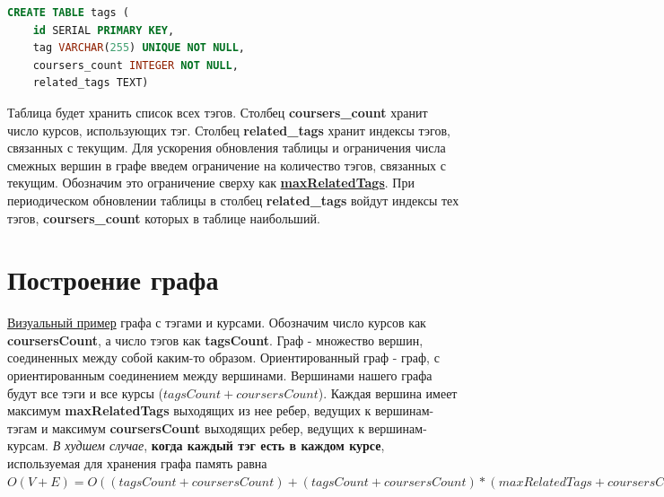 \documentclass[12pt]{article}
\begin{document}
\begin{lstlisting}[language=sql]
CREATE TABLE tags (
	id SERIAL PRIMARY KEY,
	tag VARCHAR(255) UNIQUE NOT NULL,
	coursers_count INTEGER NOT NULL,
	related_tags TEXT)
\end{lstlisting}

\noindent Таблица будет хранить список всех тэгов. \newline
Столбец \textbf{coursers\_count} хранит число курсов, использующих тэг. \newline
Столбец \textbf{related\_tags} хранит индексы тэгов, связанных с текущим. \newline
Для ускорения обновления таблицы и ограничения числа смежных вершин в графе введем ограничение на количество тэгов, связанных с текущим. Обозначим это ограничение сверху как \underline{\textbf{maxRelatedTags}}. При периодическом обновлении таблицы в столбец \textbf{related\_tags} войдут индексы тех тэгов, \textbf{coursers\_count} которых в таблице наибольший. \newline

\section*{Построение графа}
\href{https://getfile.dokpub.com/yandex/get/https://disk.yandex.ru/d/yRuwHZWdXBIIaA}{\color{blue}Визуальный пример} графа с тэгами и курсами. \newline
Обозначим число курсов как \textbf{coursersCount}, а число тэгов как \textbf{tagsCount}. \newline
Граф - множество вершин, соединенных между собой каким-то образом. Ориентированный граф - граф, с ориентированным соединением между вершинами. \newline \newline
Вершинами нашего графа будут все тэги и все курсы ($tagsCount + coursersCount$). Каждая вершина имеет максимум \textbf{maxRelatedTags} выходящих из нее ребер, ведущих к вершинам-тэгам и максимум \textbf{coursersCount} выходящих ребер, ведущих к вершинам-курсам. \newline
\textit{В худшем случае}, \textbf{когда каждый тэг есть в каждом курсе}, используемая для хранения графа память равна $O(V+E) = O((tagsCount + coursersCount) + (tagsCount + coursersCount)*(maxRelatedTags + coursersCount))$ \newline
\end{document}
